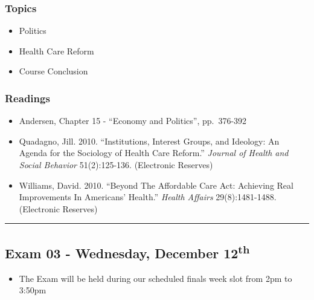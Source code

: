 \documentclass[]{book}
\providecommand{\tightlist}{%
  \setlength{\itemsep}{0pt}\setlength{\parskip}{0pt}}
\newenvironment{rmdblock}[1]
  {\begin{shaded*}
  \begin{itemize}
  \renewcommand{\labelitemi}{
    \raisebox{-.7\height}[0pt][0pt]{
      {\setkeys{Gin}{width=3em,keepaspectratio}\texttt{[image: images/\#1]}}
    }
  }
  \item
  }
  {
  \end{itemize}
  \end{shaded*}
  }
\newenvironment{rmdwarning}
  {\begin{rmdblock}{warning}}
  {\end{rmdblock}}
\theoremstyle{definition}
\theoremstyle{definition}
\theoremstyle{definition}
\theoremstyle{remark}
\begin{document}
\hypertarget{topics-30}{%
\subsubsection*{Topics}\label{topics-30}}

\begin{itemize}
\tightlist
\item
  Politics
\item
  Health Care Reform
\item
  Course Conclusion
\end{itemize}

\hypertarget{readings-28}{%
\subsubsection*{Readings}\label{readings-28}}

\begin{itemize}
\tightlist
\item
  Andersen, Chapter 15 - ``Economy and Politics'', pp.~376-392
\item
  Quadagno, Jill. 2010. ``Institutions, Interest Groups, and Ideology:
  An Agenda for the Sociology of Health Care Reform.'' \emph{Journal of
  Health and Social Behavior} 51(2):125-136. (Electronic Reserves)
\item
  Williams, David. 2010. ``Beyond The Affordable Care Act: Achieving
  Real Improvements In Americans' Health.'' \emph{Health Affairs}
  29(8):1481-1488. (Electronic Reserves)
\end{itemize}

\begin{center}\rule{0.5\linewidth}{\linethickness}\end{center}

\hypertarget{exam-03---wednesday-december-12th}{%
\subsection*{\texorpdfstring{Exam 03 - Wednesday, December
12\textsuperscript{th}}{Exam 03 - Wednesday, December 12th}}\label{exam-03---wednesday-december-12th}}

\begin{rmdwarning}
The Exam will be held during our scheduled finals week slot from 2pm to
3:50pm
\end{rmdwarning}
\end{document}
